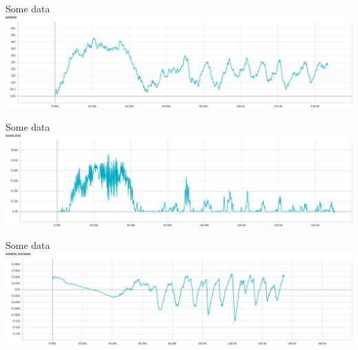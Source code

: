 \documentclass[11pt]{beamer}
\begin{document}
\begin{frame}{Some data}
\includegraphics[width=\textwidth]{figures/window}
\end{frame}

\begin{frame}{Some data}
\includegraphics[width=\textwidth]{figures/score_lost}
\end{frame}

\begin{frame}{Some data}
\includegraphics[width=\textwidth]{figures/window_increase}
\end{frame}
\end{document}
